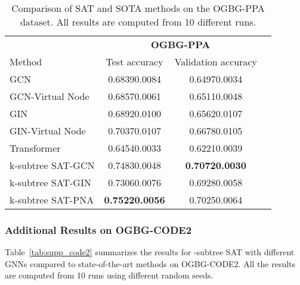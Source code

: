 \begin{table}
  \centering
  \caption{Comparison of SAT and SOTA methods on the OGBG-PPA dataset. All results are computed from 10 different runs.}
  \label{tab:supp_ppa}
  \begin{sc}
        \begin{tabular}{lccc}
        \toprule
        {}& \multicolumn{2}{c}{\textbf{OGBG-PPA}} \\
        Method & Test accuracy & Validation accuracy \\
        \midrule
        GCN & 0.68390.0084 & 0.64970.0034 \\
        GCN-Virtual Node & 0.68570.0061 & 0.65110.0048	\\
        GIN & 0.68920.0100 & 0.65620.0107 \\
        GIN-Virtual Node & 0.70370.0107 & 0.66780.0105 \\
        \midrule
        Transformer & 0.64540.0033 & 0.62210.0039 \\
        \midrule
        k-subtree SAT-GCN & 0.74830.0048 & \textbf{0.70720.0030} \\
        k-subtree SAT-GIN & 0.73060.0076 & 0.69280.0058 \\
        k-subtree SAT-PNA & \textbf{0.75220.0056} & 0.70250.0064 \\
        \bottomrule
        \end{tabular}
    \end{sc}
\end{table}

\subsubsection{Additional Results on OGBG-CODE2}
Table~\ref{tab:supp_code2} summarizes the results for -subtree SAT with different GNNs compared to state-of-the-art methods on OGBG-CODE2. All the results are computed from 10 runs using different random seeds.

